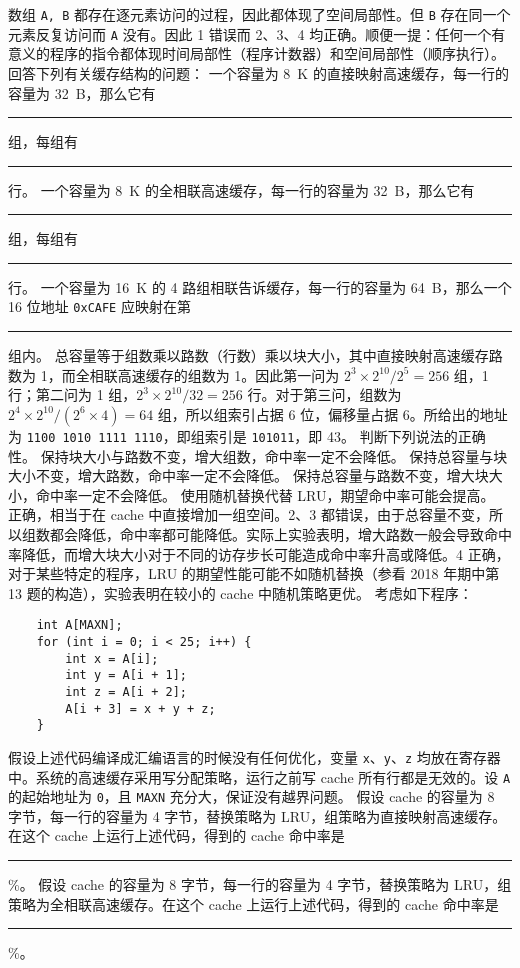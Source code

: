 \begin{problems}
        \sol 数组 \verb|A, B| 都存在逐元素访问的过程，因此都体现了空间局部性。但 \verb|B| 存在同一个元素反复访问而 \verb|A| 没有。因此 1 错误而 2、3、4 均正确。顺便一提：任何一个有意义的程序的指令都体现时间局部性（程序计数器）和空间局部性（顺序执行）。
        \pro 回答下列有关缓存结构的问题：
            \qn 一个容量为 \SI{8}{K} 的直接映射高速缓存，每一行的容量为 \SI{32}{B}，那么它有 \rule{2.5cm}{0.25mm} 组，每组有 \rule{2.5cm}{0.25mm} 行。
            \qn 一个容量为 \SI{8}{K} 的全相联高速缓存，每一行的容量为 \SI{32}{B}，那么它有 \rule{2.5cm}{0.25mm} 组，每组有 \rule{2.5cm}{0.25mm} 行。
            \qn 一个容量为 \SI{16}{K} 的 4 路组相联告诉缓存，每一行的容量为 \SI{64}{B}，那么一个 16 位地址 \verb|0xCAFE| 应映射在第 \rule{2.5cm}{0.25mm} 组内。
        \sol 总容量等于组数乘以路数（行数）乘以块大小，其中直接映射高速缓存路数为 1，而全相联高速缓存的组数为 1。因此第一问为 $2^3 \times 2^10/2^5=256$ 组，1 行；第二问为 1 组，$2^3 \times 2^10/32=256$ 行。对于第三问，组数为 $2^4 \times 2^10/(2^6 \times 4)=64$ 组，所以组索引占据 6 位，偏移量占据 6。所给出的地址为 \verb|1100 1010 1111 1110|，即组索引是 \verb|101011|，即 43。
        \pro 判断下列说法的正确性。
            \qn 保持块大小与路数不变，增大组数，命中率一定不会降低。
            \qn 保持总容量与块大小不变，增大路数，命中率一定不会降低。
            \qn 保持总容量与路数不变，增大块大小，命中率一定不会降低。
            \qn 使用随机替换代替 LRU，期望命中率可能会提高。
         正确，相当于在 cache 中直接增加一组空间。2、3 都错误，由于总容量不变，所以组数都会降低，命中率都可能降低。实际上实验表明，增大路数一般会导致命中率降低，而增大块大小对于不同的访存步长可能造成命中率升高或降低。4 正确，对于某些特定的程序，LRU 的期望性能可能不如随机替换（参看 2018 年期中第 13 题的构造），实验表明在较小的 cache 中随机策略更优。
        \pro 考虑如下程序：
        \begin{verbatim}
    int A[MAXN];
    for (int i = 0; i < 25; i++) {
        int x = A[i];
        int y = A[i + 1];
        int z = A[i + 2];
        A[i + 3] = x + y + z;
    }
        \end{verbatim}
        假设上述代码编译成汇编语言的时候没有任何优化，变量 \verb|x|、\verb|y|、\verb|z| 均放在寄存器中。系统的高速缓存采用写分配策略，运行之前写 cache 所有行都是无效的。设 \verb|A| 的起始地址为 \verb|0|，且 \verb|MAXN| 充分大，保证没有越界问题。
        \qn 假设 cache 的容量为 8 字节，每一行的容量为 4 字节，替换策略为 LRU，组策略为直接映射高速缓存。在这个 cache 上运行上述代码，得到的 cache 命中率是 \rule{2.5cm}{0.25mm}\%。
        \qn 假设 cache 的容量为 8 字节，每一行的容量为 4 字节，替换策略为 LRU，组策略为全相联高速缓存。在这个 cache 上运行上述代码，得到的 cache 命中率是 \rule{2.5cm}{0.25mm}\%。

\end{problems}
